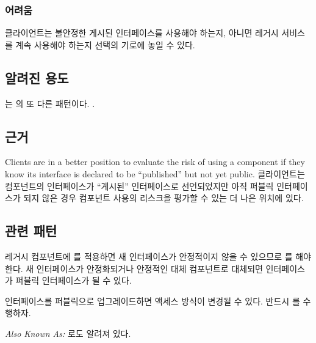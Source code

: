 \documentclass[a4paper,10pt,twoside]{book}
\begin{document}
\subsubsection*{어려움}

\begin{bulletlist}
\item 클라이언트는 불안정한 게시된 인터페이스를 사용해야 하는지, 아니면 레거시 서비스를 계속 사용해야 하는지 선택의 기로에 놓일 수 있다.
\end{bulletlist}

\subsection*{알려진 용도}

는 의 또 다른 패턴이다. \cite{Ocal00a}.

\subsection*{근거}

Clients are in a better position to evaluate the risk of using a component if they know its interface is declared to be ``published'' but not yet public.
클라이언트는 컴포넌트의 인터페이스가 ``게시된'' 인터페이스로 선언되었지만 아직 퍼블릭 인터페이스가 되지 않은 경우 컴포넌트 사용의 리스크을 평가할 수 있는 더 나은 위치에 있다.

\subsection*{관련 패턴}

레거시 컴포넌트에 를 적용하면 새 인터페이스가 안정적이지 않을 수 있으므로 를 해야 한다. 새 인터페이스가 안정화되거나 안정적인 대체 컴포넌트로 대체되면 인터페이스가 퍼블릭 인터페이스가 될 수 있다.

인터페이스를 퍼블릭으로 업그레이드하면 액세스 방식이 변경될 수 있다. 반드시 를 수행하자.


\emph{Also Known As:}   \cite{Stev98a}
 \cite{Stev98a}로도 알려져 있다.
\end{document}
